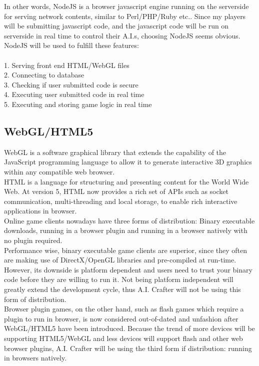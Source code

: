 \documentclass[12pt]{article}
\begin{document}
In other words, NodeJS is a browser javascript engine running on the serverside for serving network contents, similar to Perl/PHP/Ruby etc.. Since my players will be submitting javascript code, and the javascript code will be run on serverside in real time to control their A.I.s, choosing NodeJS seems obvious. NodeJS will be used to fulfill these features:\\
\\
1. Serving front end HTML/WebGL files\\
2. Connecting to database\\
3. Checking if user submitted code is secure\\
4. Executing user submitted code in real time\\
5. Executing and storing game logic in real time\\

\subsection{WebGL/HTML5}
WebGL is a software graphical library that extends the capability of the JavaScript programming language to allow it to generate interactive 3D graphics within any compatible web browser. \\

HTML is a language for structuring and presenting content for the World Wide Web. At version 5, HTML now provides a rich set of APIs such as socket communication, multi-threading and local storage, to enable rich interactive applications in browser.\\

Online game clients nowadays have three forms of distribution: Binary executable downloads, running in a browser plugin and running in a browser natively with no plugin required.\\ 

Performance wise, binary executable game clients are superior, since they often are making use of DirectX/OpenGL libraries and pre-compiled at run-time. However, its downside is platform dependent and users need to trust your binary code before they are willing to run it. Not being platform independent will greatly extend the development cycle, thus A.I. Crafter will not be using this form of distribution.\\ 

Browser plugin games, on the other hand, such as flash games which require a plugin to run in browser, is now considered out-of-dated and unfashion after WebGL/HTML5 have been introduced. Because the trend of more devices will be supporting HTML5/WebGL and less devices will support flash and other web browser plugins, A.I. Crafter will be using the third form if distribution: running in browsers natively.\\ 
\end{document}
